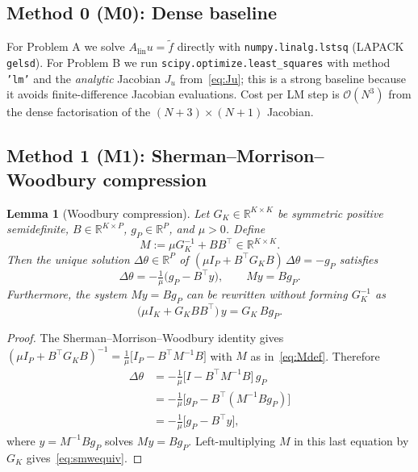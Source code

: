\documentclass[11pt,a4paper]{article}
\newcommand{\R}{\mathbb{R}}
\newcommand{\Order}{\mathcal{O}}
\newcommand{\Alin}{A_{\mathrm{lin}}}
\newcommand{\GK}{G_{K}}
\newcommand{\Bt}{B^{\!\top}}
\newtheorem{lemma}{Lemma}
\begin{document}
\subsection{Method 0 (M0): Dense baseline}
\label{sec:m0}

For Problem A we solve $\Alin u = \tilde f$ directly with
\texttt{numpy.linalg.lstsq} (LAPACK \texttt{gelsd}). For Problem B we run
\texttt{scipy.optimize.least\_squares} with method \texttt{'lm'} and the
\emph{analytic} Jacobian $J_{u}$ from~\eqref{eq:Ju}; this is a strong baseline
because it avoids finite-difference Jacobian evaluations. Cost per LM step is
$\Order(N^{3})$ from the dense factorisation of the $(N+3)\times(N+1)$ Jacobian.

\subsection{Method 1 (M1): Sherman--Morrison--Woodbury compression}
\label{sec:smw}

\begin{lemma}[Woodbury compression]
\label{lem:smw}
Let $\GK\in\R^{K\times K}$ be symmetric positive semidefinite, $B\in\R^{K\times P}$,
$g_{P}\in\R^{P}$, and $\mu > 0$. Define
\begin{equation}
M := \mu \GK^{-1} + B \Bt \in\R^{K\times K}.
\label{eq:Mdef}
\end{equation}
Then the unique solution $\Delta\theta\in\R^{P}$ of
$(\mu I_{P} + \Bt \GK B)\,\Delta\theta = -g_{P}$
satisfies
\begin{equation}
\Delta\theta = -\tfrac{1}{\mu}\bigl(g_{P} - \Bt y\bigr), \qquad
M y = B g_{P}.
\label{eq:smwfinal}
\end{equation}
Furthermore, the system $M y = B g_{P}$ can be rewritten without forming
$\GK^{-1}$ as
\begin{equation}
\bigl(\mu I_{K} + \GK B \Bt\bigr)\, y = \GK\, B g_{P}.
\label{eq:smwequiv}
\end{equation}
\end{lemma}

\begin{proof}
The Sherman--Morrison--Woodbury identity gives
$(\mu I_{P} + \Bt \GK B)^{-1} = \tfrac{1}{\mu}\bigl[I_{P} - \Bt M^{-1} B\bigr]$
with $M$ as in~\eqref{eq:Mdef}. Therefore
\begin{align*}
\Delta\theta
&= -\tfrac{1}{\mu}\bigl[I - \Bt M^{-1} B\bigr]\, g_{P}\\
&= -\tfrac{1}{\mu}\bigl[g_{P} - \Bt (M^{-1} B g_{P})\bigr]\\
&= -\tfrac{1}{\mu}\bigl[g_{P} - \Bt y\bigr],
\end{align*}
where $y = M^{-1} B g_{P}$ solves $M y = B g_{P}$. Left-multiplying $M$ in this
last equation by $\GK$ gives~\eqref{eq:smwequiv}.
\end{proof}
\end{document}
